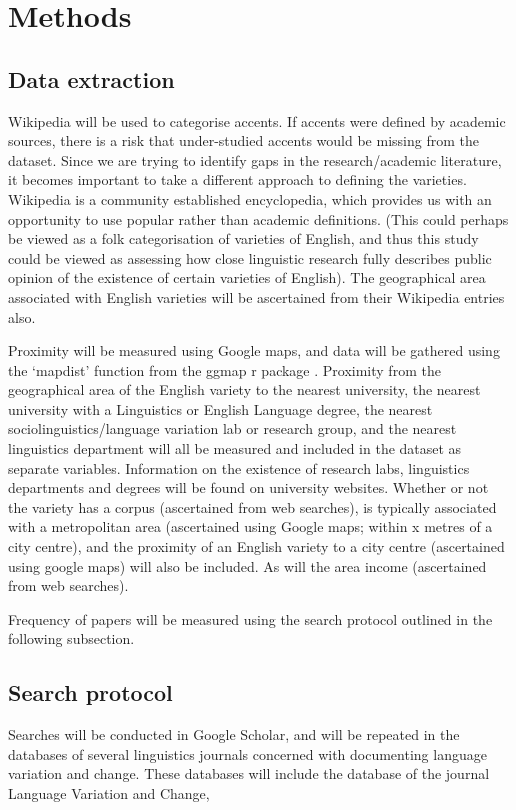 \documentclass[review]{elsarticle}
\begin{document}
\section{Methods}




\subsection{Data extraction}
Wikipedia will be used to categorise accents. If accents were defined by academic sources, there is a risk that under-studied accents would be missing from the dataset. Since we are trying to identify gaps in the research/academic literature, it becomes important to take a different approach to defining the varieties. Wikipedia is a community established encyclopedia, which provides us with an opportunity to use popular rather than academic definitions. (This could perhaps be viewed as a folk categorisation of varieties of English, and thus this study could be viewed as assessing how close linguistic research fully describes public opinion of the existence of certain varieties of English). The geographical area associated with English varieties will be ascertained from their Wikipedia entries also.

Proximity will be measured using Google maps, and data will be gathered using the `mapdist' function from the ggmap r package \cite{kahle2013ggmap,R2018}. Proximity from the geographical area of the English variety to the nearest university, the nearest university with a Linguistics or English Language degree, the nearest sociolinguistics/language variation lab or research group, and the nearest linguistics department will all be measured and included in the dataset as separate variables. Information on the existence of research labs, linguistics departments and degrees will be found on university websites. Whether or not the variety has a corpus (ascertained from web searches), is typically associated with a metropolitan area (ascertained using Google maps; within x metres of a city centre), and the proximity of an English variety to a city centre (ascertained using google maps) will also be included. As will the area income (ascertained from web searches).

Frequency of papers will be measured using the search protocol outlined in the following subsection. 

\subsection{Search protocol}
Searches will be conducted in Google Scholar, and will be repeated in the databases of several linguistics journals concerned with documenting language variation and change. These databases will include the database of the journal Language Variation and Change, 
\end{document}

